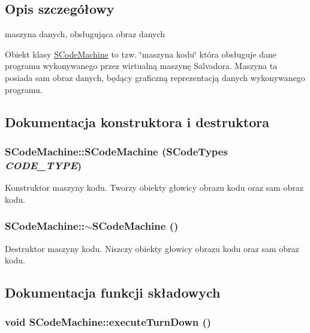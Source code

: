 \subsection{Opis szczegółowy}
maszyna danych, obsługująca obraz danych 

Obiekt klasy \hyperlink{classSCodeMachine}{SCodeMachine} to tzw. \char`\"{}maszyna kodu\char`\"{} która obsługuje dane programu wykonywanego przez wirtualną maszynę Salvadora. Maszyna ta posiada sam obraz danych, będący graficzną reprezentacją danych wykonywanego programu. 

\subsection{Dokumentacja konstruktora i destruktora}
\hypertarget{classSCodeMachine_bb85f472be7c8e2112bbe5d6643f99b7}{
\subsubsection[{SCodeMachine}]{\setlength{\rightskip}{0pt plus 5cm}SCodeMachine::SCodeMachine ({\bf SCodeTypes} {\em CODE\_\-TYPE})}}
\label{classSCodeMachine_bb85f472be7c8e2112bbe5d6643f99b7}


Konstruktor maszyny kodu. Tworzy obiekty głowicy obrazu kodu oraz sam obraz kodu. \hypertarget{classSCodeMachine_67d39a3662fc2640aa506a581766a9b8}{
\subsubsection[{$\sim$SCodeMachine}]{\setlength{\rightskip}{0pt plus 5cm}SCodeMachine::$\sim$SCodeMachine ()}}
\label{classSCodeMachine_67d39a3662fc2640aa506a581766a9b8}


Destruktor maszyny kodu. Niszczy obiekty głowicy obrazu kodu oraz sam obraz kodu. 

\subsection{Dokumentacja funkcji składowych}
\hypertarget{classSCodeMachine_26b7ba8981d08d594b0c37617aa85277}{
\subsubsection[{executeTurnDown}]{\setlength{\rightskip}{0pt plus 5cm}void SCodeMachine::executeTurnDown ()}}
\label{classSCodeMachine_26b7ba8981d08d594b0c37617aa85277}


